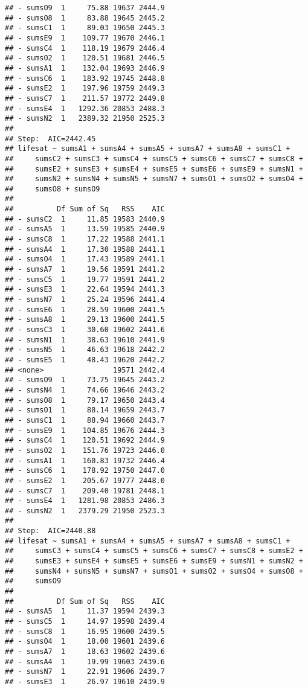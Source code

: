 \documentclass[,man,floatsintext]{apa6}
\begin{document}
\begin{verbatim}
## - sumsO9  1     75.88 19637 2444.9
## - sumsO8  1     83.88 19645 2445.2
## - sumsC1  1     89.03 19650 2445.3
## - sumsE9  1    109.77 19670 2446.1
## - sumsC4  1    118.19 19679 2446.4
## - sumsO2  1    120.51 19681 2446.5
## - sumsA1  1    132.04 19693 2446.9
## - sumsC6  1    183.92 19745 2448.8
## - sumsE2  1    197.96 19759 2449.3
## - sumsC7  1    211.57 19772 2449.8
## - sumsE4  1   1292.36 20853 2488.3
## - sumsN2  1   2389.32 21950 2525.3
## 
## Step:  AIC=2442.45
## lifesat ~ sumsA1 + sumsA4 + sumsA5 + sumsA7 + sumsA8 + sumsC1 + 
##     sumsC2 + sumsC3 + sumsC4 + sumsC5 + sumsC6 + sumsC7 + sumsC8 + 
##     sumsE2 + sumsE3 + sumsE4 + sumsE5 + sumsE6 + sumsE9 + sumsN1 + 
##     sumsN2 + sumsN4 + sumsN5 + sumsN7 + sumsO1 + sumsO2 + sumsO4 + 
##     sumsO8 + sumsO9
## 
##          Df Sum of Sq   RSS    AIC
## - sumsC2  1     11.85 19583 2440.9
## - sumsA5  1     13.59 19585 2440.9
## - sumsC8  1     17.22 19588 2441.1
## - sumsA4  1     17.30 19588 2441.1
## - sumsO4  1     17.43 19589 2441.1
## - sumsA7  1     19.56 19591 2441.2
## - sumsC5  1     19.77 19591 2441.2
## - sumsE3  1     22.64 19594 2441.3
## - sumsN7  1     25.24 19596 2441.4
## - sumsE6  1     28.59 19600 2441.5
## - sumsA8  1     29.13 19600 2441.5
## - sumsC3  1     30.60 19602 2441.6
## - sumsN1  1     38.63 19610 2441.9
## - sumsN5  1     46.63 19618 2442.2
## - sumsE5  1     48.43 19620 2442.2
## <none>                19571 2442.4
## - sumsO9  1     73.75 19645 2443.2
## - sumsN4  1     74.66 19646 2443.2
## - sumsO8  1     79.17 19650 2443.4
## - sumsO1  1     88.14 19659 2443.7
## - sumsC1  1     88.94 19660 2443.7
## - sumsE9  1    104.85 19676 2444.3
## - sumsC4  1    120.51 19692 2444.9
## - sumsO2  1    151.76 19723 2446.0
## - sumsA1  1    160.83 19732 2446.4
## - sumsC6  1    178.92 19750 2447.0
## - sumsE2  1    205.67 19777 2448.0
## - sumsC7  1    209.40 19781 2448.1
## - sumsE4  1   1281.98 20853 2486.3
## - sumsN2  1   2379.29 21950 2523.3
## 
## Step:  AIC=2440.88
## lifesat ~ sumsA1 + sumsA4 + sumsA5 + sumsA7 + sumsA8 + sumsC1 + 
##     sumsC3 + sumsC4 + sumsC5 + sumsC6 + sumsC7 + sumsC8 + sumsE2 + 
##     sumsE3 + sumsE4 + sumsE5 + sumsE6 + sumsE9 + sumsN1 + sumsN2 + 
##     sumsN4 + sumsN5 + sumsN7 + sumsO1 + sumsO2 + sumsO4 + sumsO8 + 
##     sumsO9
## 
##          Df Sum of Sq   RSS    AIC
## - sumsA5  1     11.37 19594 2439.3
## - sumsC5  1     14.97 19598 2439.4
## - sumsC8  1     16.95 19600 2439.5
## - sumsO4  1     18.00 19601 2439.6
## - sumsA7  1     18.63 19602 2439.6
## - sumsA4  1     19.99 19603 2439.6
## - sumsN7  1     22.91 19606 2439.7
## - sumsE3  1     26.97 19610 2439.9

\end{verbatim}
\end{document}
